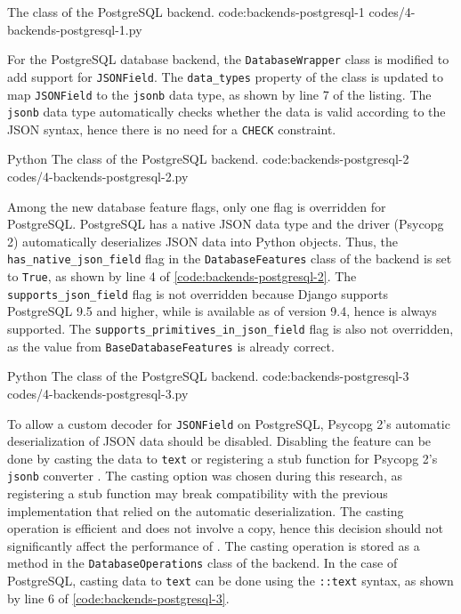 {The  class of the PostgreSQL backend.}
{code:backends-postgresql-1}
{codes/4-backends-postgresql-1.py}

For the PostgreSQL database backend, the \verb|DatabaseWrapper| class is
modified to add support for \verb|JSONField|. The \verb|data_types| property of
the class is updated to map \verb|JSONField| to the \verb|jsonb| data type, as
shown by line 7 of the listing. The \verb|jsonb| data type automatically checks
whether the data is valid according to the JSON syntax, hence there is no need
for a \verb|CHECK| constraint.

\listing
{Python}
{The  class of the PostgreSQL backend.}
{code:backends-postgresql-2}
{codes/4-backends-postgresql-2.py}

Among the new database feature flags, only one flag is overridden for
PostgreSQL. PostgreSQL has a native JSON data type and the driver (Psycopg 2)
automatically deserializes JSON data into Python objects. Thus, the
\verb|has_native_json_field| flag in the \verb|DatabaseFeatures| class of the
backend is set to \verb|True|, as shown by line 4 of
\autoref{code:backends-postgresql-2}. The \verb|supports_json_field| flag is
not overridden because Django supports PostgreSQL 9.5 and higher, while
 is available as of version 9.4, hence  is always
supported. The \verb|supports_primitives_in_json_field| flag is also not
overridden, as the value from \verb|BaseDatabaseFeatures| is already correct.

\listing
{Python}
{The  class of the PostgreSQL backend.}
{code:backends-postgresql-3}
{codes/4-backends-postgresql-3.py}

To allow a custom decoder for \verb|JSONField| on PostgreSQL, Psycopg 2's
automatic deserialization of JSON data should be disabled. Disabling the
feature can be done by casting the data to \verb|text| or registering a stub
function for Psycopg 2's \verb|jsonb| converter
\cite{psycopg2:json-adaptation}. The casting option was chosen during this
research, as registering a stub function may break compatibility with the
previous implementation that relied on the automatic deserialization. The
casting operation is efficient and does not involve a copy, hence this decision
should not significantly affect the performance of 
\cite{psycopg2:json-adaptation}. The casting operation is stored as a method in
the \verb|DatabaseOperations| class of the backend. In the case of PostgreSQL,
casting data to \verb|text| can be done using the \verb|::text| syntax, as
shown by line 6 of \autoref{code:backends-postgresql-3}.


